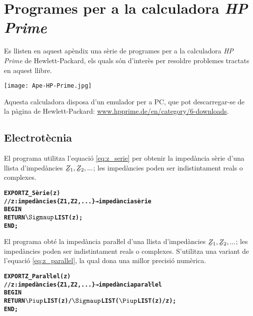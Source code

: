 \chapter{Programes per a la calculadora \emph{HP Prime}}\label{sec:progs-HP}

Es llisten en aquest apèndix una sèrie de programes per a la calculadora \emph{HP Prime} de Hewlett-Packard, els quals són d'interès per resoldre problemes tractats en aquest llibre.

\begin{center}
\texttt{[image: Ape-HP-Prime.jpg]}
\end{center}

Aquesta calculadora disposa d'un emulador per a PC, que pot descarregar-se de la pàgina de Hewlett-Packard: \href{http://www.hpprime.de/en/category/6-downloads}{www.hpprime.de/en/category/6-downloads}.

\section{Electrotècnia}\label{sec:HP_ELC}

El programa  utilitza l'equació \eqref{eq:z_serie} per obtenir la impedància sèrie d'una llista d'impedàncies $\cmplx{Z}_1, \cmplx{Z}_2, ...$; les impedàncies poden ser indistintament reals o complexes.
\vspace{-1cm}
\begin{alltt}
\bfseries
{}
    EXPORT Z_Sèrie(z)
    // z:impedàncies \{Z1, Z2, ...\} → impedància sèrie
    BEGIN
      RETURN \(\Sigmaup\)LIST(z);
    END;
\end{alltt}

El programa  obté la impedància paraŀlel  d'una llista d'impedàncies $\cmplx{Z}_1, \cmplx{Z}_2, ...$; les impedàncies poden ser indistintament reals o complexes. S'utilitza una variant de l'equació \eqref{eq:z_parallel}, la qual dona una millor precisió numèrica.
\vspace{-1cm}
\begin{alltt}
\bfseries
{}
    EXPORT Z_Paraŀlel(z)
    // z:impedàncies \{Z1, Z2, ...\} → impedància paraŀlel
    BEGIN
      RETURN \(\Piup\)LIST(z)/\(\Sigmaup\)LIST(\(\Piup\)LIST(z)/z);
    END;
\end{alltt}

